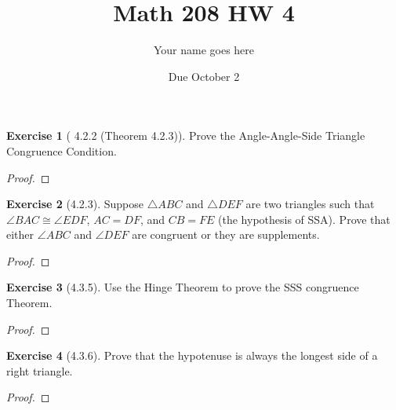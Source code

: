 \documentclass[12pt]{article}		%
\title{Math 208 HW 4}
\author{Your name goes here}
\date{Due October 2}
\theoremstyle{definition}
\newtheorem*{ex}{Exercise}
\begin{document}
	\maketitle
	
	

		
\begin{ex}[ 4.2.2 (Theorem 4.2.3)]
	Prove the Angle-Angle-Side Triangle Congruence Condition.
\end{ex}

\begin{proof} 
	
\end{proof}

\vspace{1in} %



\begin{ex}[4.2.3]
	Suppose $\triangle ABC$ and $\triangle DEF$ are two triangles such that $\angle BAC \cong \angle EDF$, $AC = DF$, and $CB = FE$ (the hypothesis of SSA).  Prove that either $\angle ABC$ and $\angle DEF$ are congruent or they are supplements. 
\end{ex}

\begin{proof} 
	
\end{proof}


\vspace{1in} %



\begin{ex}[4.3.5]
Use the Hinge Theorem to prove the SSS congruence Theorem.

\end{ex}

\begin{proof} 
	
\end{proof}


\vspace{1in} %



\begin{ex}[4.3.6]
	Prove that the hypotenuse is always the longest side of a right triangle.
\end{ex}

\begin{proof} 
	
\end{proof}



\vspace{1in} %




	
	
	
\end{document}
